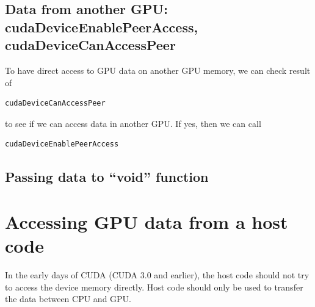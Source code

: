 \subsection{Data from another GPU: cudaDeviceEnablePeerAccess, cudaDeviceCanAccessPeer}
\label{sec:cudaDeviceEnablePeerAccess}

To have direct access to GPU data on another GPU memory, we can check result of

\begin{verbatim}
cudaDeviceCanAccessPeer
\end{verbatim}
to see if we can access data in another GPU. If yes, then we can call

\begin{verbatim}
cudaDeviceEnablePeerAccess
\end{verbatim}

\subsection{Passing data to ``void'' function}
\label{sec:ccuda_passdata}


\section{Accessing GPU data from a host code}
\label{sec:accessing-data-from-host-code}

In the early days of CUDA (CUDA 3.0 and earlier), the host code should not try
to access the device memory directly. Host code should only be used to transfer
the data between CPU and GPU.

